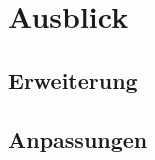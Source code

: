 \section{Ausblick}\label{ausblick}

	\subsection{Erweiterung}
	\blindtext[10]
	
	\subsection{Anpassungen}
